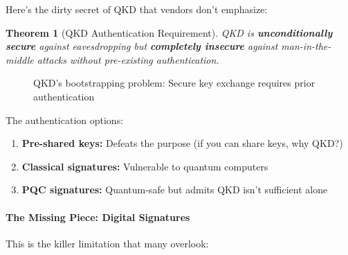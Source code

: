 \documentclass[11pt,a4paper]{article}
\newcommand{\xmark}{\ding{55}}
\newtheorem{theorem}{Theorem}
\begin{document}
Here's the dirty secret of QKD that vendors don't emphasize:

\begin{theorem}[QKD Authentication Requirement]
QKD is \textbf{unconditionally secure} against eavesdropping but \textbf{completely insecure} against man-in-the-middle attacks without pre-existing authentication.
\end{theorem}

\begin{figure}[h]
\centering
{}
\caption{QKD's bootstrapping problem: Secure key exchange requires prior authentication}
\end{figure}

The authentication options:
\begin{enumerate}
    \item \textbf{Pre-shared keys:} Defeats the purpose (if you can share keys, why QKD?)
    \item \textbf{Classical signatures:} Vulnerable to quantum computers
    \item \textbf{PQC signatures:} Quantum-safe but admits QKD isn't sufficient alone
\end{enumerate}

\paragraph{The Missing Piece: Digital Signatures}

This is the killer limitation that many overlook:
\end{document}
